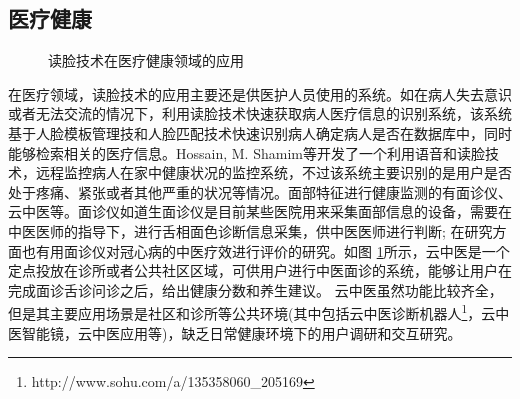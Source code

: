 \subsection{医疗健康}
\begin{figure}[h]
    \centering
    \caption{读脸技术在医疗健康领域的应用}
    \label{fig:med}
\end{figure}
在医疗领域，读脸技术的应用主要还是供医护人员使用的系统。如在病人失去意识或者无法交流的情况下，利用读脸技术快速获取病人医疗信息的识别系统\cite{nwosu2016mobile}，该系统基于人脸模板管理技和人脸匹配技术快速识别病人确定病人是否在数据库中，同时能够检索相关的医疗信息。Hossain, M. Shamim等\cite{Hossain2015Cloud}开发了一个利用语音和读脸技术，远程监控病人在家中健康状况的监控系统，不过该系统主要识别的是用户是否处于疼痛、紧张或者其他严重的状况等情况。面部特征进行健康监测的有面诊仪、云中医\cite{Zhang2018Study}等。面诊仪如道生面诊仪\cite{邸丹2016手持式舌象仪的研制}是目前某些医院用来采集面部信息的设备，需要在中医医师的指导下，进行舌相面色诊断信息采集，供中医医师进行判断; 在研究方面也有用面诊仪对冠心病的中医疗效进行评价的研究。如图 \ref{fig:med}所示，云中医是一个定点投放在诊所或者公共社区区域，可供用户进行中医面诊的系统，能够让用户在完成面诊舌诊问诊之后，给出健康分数和养生建议。
云中医虽然功能比较齐全，但是其主要应用场景是社区和诊所等公共环境(其中包括云中医诊断机器人\footnote{http://www.sohu.com/a/135358060_205169}，云中医智能镜\cite{李雪2016}，云中医应用\cite{钱鹏基于云中医的健康监测方法及系统}等)，缺乏日常健康环境下的用户调研和交互研究。

